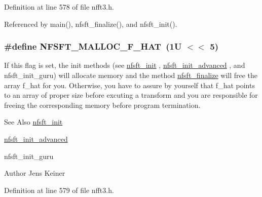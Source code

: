Definition at line 578 of file nfft3.\-h.



Referenced by main(), nfsft\-\_\-finalize(), and nfsft\-\_\-init().

\hypertarget{group__nfsft_gab76dcf8db948f18cc87403dac804fc68}{
\subsubsection[{N\-F\-S\-F\-T\-\_\-\-M\-A\-L\-L\-O\-C\-\_\-\-F\-\_\-\-H\-A\-T}]{\setlength{\rightskip}{0pt plus 5cm}\#define N\-F\-S\-F\-T\-\_\-\-M\-A\-L\-L\-O\-C\-\_\-\-F\-\_\-\-H\-A\-T~(1\-U $<$$<$ 5)}}\label{group__nfsft_gab76dcf8db948f18cc87403dac804fc68}
If this flag is set, the init methods (see \hyperlink{group__nfsft_ga65cda3f4a3edc5eb39c697cf34b1f0b9}{nfsft\-\_\-init} , \hyperlink{group__nfsft_ga2812aa5beba0eb7efd3072bf323a0155}{nfsft\-\_\-init\-\_\-advanced} , and nfsft\-\_\-init\-\_\-guru) will allocate memory and the method \hyperlink{group__nfsft_gaa63e193a27d84059742ff25ff81e2ed1}{nfsft\-\_\-finalize} will free the array {\ttfamily f\-\_\-hat} for you. Otherwise, you have to assure by yourself that {\ttfamily f\-\_\-hat} points to an array of proper size before excuting a transform and you are responsible for freeing the corresponding memory before program termination.

\begin{DoxySeeAlso}{See Also}
\hyperlink{group__nfsft_ga65cda3f4a3edc5eb39c697cf34b1f0b9}{nfsft\-\_\-init} 

\hyperlink{group__nfsft_ga2812aa5beba0eb7efd3072bf323a0155}{nfsft\-\_\-init\-\_\-advanced} 

nfsft\-\_\-init\-\_\-guru 
\end{DoxySeeAlso}
\begin{DoxyAuthor}{Author}
Jens Keiner 
\end{DoxyAuthor}


Definition at line 579 of file nfft3.\-h.



